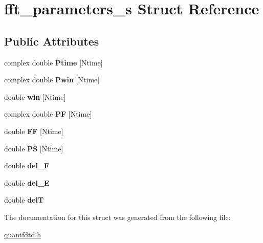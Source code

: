 \hypertarget{structfft__parameters__s}{\section{fft\-\_\-parameters\-\_\-s Struct Reference}
\label{structfft__parameters__s}
}
\subsection*{Public Attributes}
\begin{DoxyCompactItemize}
\item 
\hypertarget{structfft__parameters__s_a1f5b8266f23e66429e117c530b6bac73}{complex double {\bfseries Ptime} \mbox{[}Ntime\mbox{]}}\label{structfft__parameters__s_a1f5b8266f23e66429e117c530b6bac73}

\item 
\hypertarget{structfft__parameters__s_a28a94706a32c5e8ab171ec4d4c27383f}{complex double {\bfseries Pwin} \mbox{[}Ntime\mbox{]}}\label{structfft__parameters__s_a28a94706a32c5e8ab171ec4d4c27383f}

\item 
\hypertarget{structfft__parameters__s_a5aab1191e13e09c5ded081c80239c035}{double {\bfseries win} \mbox{[}Ntime\mbox{]}}\label{structfft__parameters__s_a5aab1191e13e09c5ded081c80239c035}

\item 
\hypertarget{structfft__parameters__s_ae9e8f46f756c2dcdda88bf429fa3170a}{complex double {\bfseries P\-F} \mbox{[}Ntime\mbox{]}}\label{structfft__parameters__s_ae9e8f46f756c2dcdda88bf429fa3170a}

\item 
\hypertarget{structfft__parameters__s_a4afc76b4d1202a9b1772a64d332395b1}{double {\bfseries F\-F} \mbox{[}Ntime\mbox{]}}\label{structfft__parameters__s_a4afc76b4d1202a9b1772a64d332395b1}

\item 
\hypertarget{structfft__parameters__s_a406527a4a906696863b1180cd6cd97fe}{double {\bfseries P\-S} \mbox{[}Ntime\mbox{]}}\label{structfft__parameters__s_a406527a4a906696863b1180cd6cd97fe}

\item 
\hypertarget{structfft__parameters__s_ac6c65bf30a46c4e3b0bdee2a8df26267}{double {\bfseries del\-\_\-\-F}}\label{structfft__parameters__s_ac6c65bf30a46c4e3b0bdee2a8df26267}

\item 
\hypertarget{structfft__parameters__s_a8982ad24a21c893d027dfdf075ff2b45}{double {\bfseries del\-\_\-\-E}}\label{structfft__parameters__s_a8982ad24a21c893d027dfdf075ff2b45}

\item 
\hypertarget{structfft__parameters__s_ad987abd1f85dbfe0e6c60abf1d1c4021}{double {\bfseries del\-T}}\label{structfft__parameters__s_ad987abd1f85dbfe0e6c60abf1d1c4021}

\end{DoxyCompactItemize}


The documentation for this struct was generated from the following file\-:\begin{DoxyCompactItemize}
\item 
\hyperlink{quantfdtd_8h}{quantfdtd.\-h}\end{DoxyCompactItemize}

